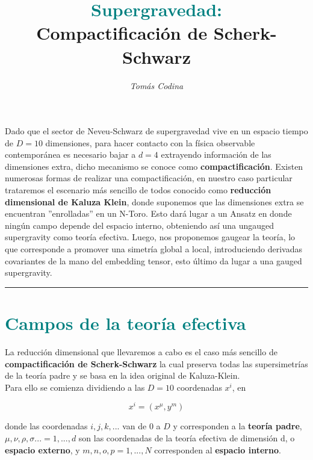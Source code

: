 \documentclass{article}
\title{\vspace{-35pt}\huge{\textbf{\textcolor{teal}{Supergravedad:}}} \\ \vspace{0.1cm} \large{\textbf{Compactificación de Scherk-Schwarz}}}
\date{\vspace{-20pt}}
\author{\textit{Tomás Codina}}
\numberwithin{equation}{section}
\begin{document}
\maketitle
\thispagestyle{fancy}






Dado que el sector de Neveu-Schwarz de supergravedad vive en un espacio tiempo de $ D=10 $ dimensiones, para hacer contacto con la física observable contemporánea es necesario bajar a $ d=4 $ extrayendo información de las dimensiones extra, dicho  mecanismo se conoce como \textbf{compactificación}. Existen numerosas formas de realizar una compactificación, en nuestro caso particular trataremos el escenario más sencillo de todos conocido como \textbf{reducción dimensional de Kaluza Klein}, donde suponemos que las dimensiones extra se encuentran ''enrolladas'' en un N-Toro. Esto dará lugar a un Ansatz en donde ningún campo depende del espacio interno, obteniendo así una ungauged supergravity como teoría efectiva. Luego, nos proponemos gaugear la teoría, lo que corresponde a promover una simetría global a local, introduciendo derivadas covariantes de la mano del embedding tensor, esto último da lugar a una gauged supergravity. 

\rule{\textwidth}{0.4pt}

\section{\textcolor{teal}{Campos de la teoría efectiva}}\label{sec_preliminares}

La reducción dimensional que llevaremos a cabo es el caso más sencillo de \textbf{compactificación de Scherk-Schwarz} la cual preserva todas las supersimetrías de la teoría padre y se basa en la idea original de Kaluza-Klein.\\

Para ello se comienza dividiendo a las $ D=10 $ coordenadas $ x^{i} $, en

\begin{equation}
x^i = (x^{\mu},y^m)
\end{equation}

donde las coordenadas $ i,j,k,... $ van de $ 0 $ a $ D $ y corresponden a la \textbf{teoría padre}, $\mu,\nu,\rho,\sigma...=1,...,d $ son las coordenadas de la teoría efectiva de dimensión d, o \textbf{espacio externo}, y $ m,n,o,p=1,...,N $ corresponden al \textbf{espacio interno}.
\end{document}

